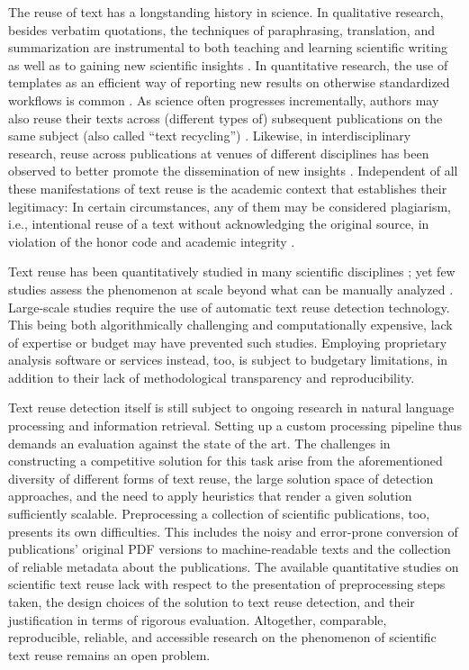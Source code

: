\documentclass[fleqn,10pt]{wlscirep}
\begin{document}
The reuse of text has a longstanding history in science. In qualitative research, besides verbatim quotations, the techniques of paraphrasing, translation, and summarization are instrumental to both teaching and learning scientific writing as well as to gaining new scientific insights \cite{sun:2015}. In quantitative research, the use of templates as an efficient way of reporting new results on otherwise standardized workflows is common \cite{anson:2020}. As science often progresses incrementally, authors may also reuse their texts across (different types of) subsequent publications on the same subject (also called ``text recycling'') \cite{moskovitz:2015,hall:2018,anson:2020}. Likewise, in interdisciplinary research, reuse across publications at venues of different disciplines has been observed to better promote the dissemination of new insights \cite{bird:2002,wen:2007}. Independent of all these manifestations of text reuse is the academic context that establishes their legitimacy: In certain circumstances, any of them may be considered plagiarism, i.e., intentional reuse of a text without acknowledging the original source, in violation of the honor code and academic integrity \cite{eberle:2013}.

Text reuse has been quantitatively studied in many scientific disciplines \cite{ganascia:2014,citron:2015,sun:2015,horbach:2019,anson:2020};
yet few studies assess the phenomenon at scale beyond what can be manually analyzed \cite{citron:2015,horbach:2019}. Large-scale studies require the use of automatic text reuse detection technology. This being both algorithmically challenging and computationally expensive, lack of expertise or budget may have prevented such studies. Employing proprietary analysis software or services instead, too, is subject to budgetary limitations, in addition to their lack of methodological transparency and reproducibility.

Text reuse detection itself is still subject to ongoing research in natural language processing and information retrieval. Setting up a custom processing pipeline thus demands an evaluation against the state of the art. The challenges in constructing a competitive solution for this task arise from the aforementioned diversity of different forms of text reuse, the large solution space of detection approaches, and the need to apply heuristics that render a given solution sufficiently scalable. Preprocessing a collection of scientific publications, too, presents its own difficulties. This includes the noisy and error-prone conversion of publications' original PDF versions to machine-readable texts and the collection of reliable metadata about the publications. The available quantitative studies on scientific text reuse lack with respect to the presentation of preprocessing steps taken, the design choices of the solution to text reuse detection, and their justification in terms of rigorous evaluation. Altogether, comparable, reproducible, reliable, and accessible research on the phenomenon of scientific text reuse remains an open problem.
\end{document}
